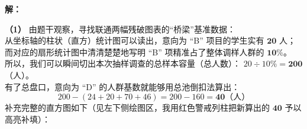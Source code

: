 \vspace{0.4cm}
\textbf{解：}

\textbf{（1）} 由题干观察，寻找联通两幅残破图表的“桥梁”基准数据：\\
从坐标轴的柱状（直方）统计图可以读出，意向为 “B” 项目的学生实有 $\boldsymbol{20}$ 人；而对应的扇形统计图中清清楚楚地写明 “B” 项精准占了整体调样人群的 $\boldsymbol{10\%}$。\\
所以，我们可以瞬间切出本次抽样调查的总样本容量（总人数）： $20 \div 10\% = \boldsymbol{200}$（人）。\\
有了总盘口，意向为 “D” 的人群基数就能够用总池倒扣法算出：
$$200 - (24 + 20 + 70 + 46) = 200 - 160 = \boldsymbol{40}\text{（人）}$$
补充完整的直方图如下（见左下侧绘图区，我用红色警戒列柱把新算出的 $\boldsymbol{40}$ 予以高亮补填）：

\vspace{0.4cm}


